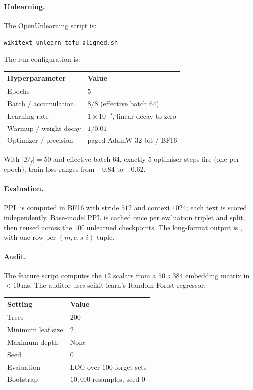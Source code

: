 \documentclass[11pt]{article}
\newcommand{\Df}{\mathcal{D}_f}
\begin{document}
\paragraph{Unlearning.} The OpenUnlearning script is:
\begin{center}
\footnotesize
\texttt{wikitext\_unlearn\_tofu\_aligned.sh}
\end{center}
The run configuration is:
\begin{center}
\footnotesize
\begin{tabular}{@{}ll@{}}
    \toprule
    Hyperparameter & Value \\
    \midrule
    Epochs & $5$ \\
    Batch / accumulation & $8 / 8$ (effective batch $64$) \\
    Learning rate & $1\!\times\!10^{-5}$, linear decay to zero \\
    Warmup / weight decay & $1 / 0.01$ \\
    Optimizer / precision & paged AdamW 32-bit / BF16 \\
    \bottomrule
\end{tabular}
\end{center}
With $|\Df|{=}50$ and effective batch $64$, exactly $5$ optimiser steps fire
(one per epoch); train loss ranges from $-0.84$ to $-0.62$.

\paragraph{Evaluation.} PPL is computed in BF16 with stride $512$ and context
$1024$; each text is scored independently. Base-model PPL is cached once per
evaluation triplet and split, then reused across the $100$ unlearned
checkpoints. The long-format output is , with one row
per $(m,e,s,i)$ tuple.

\paragraph{Audit.} The feature script  computes
the $12$ scalars from a $50\!\times\!384$ embedding matrix in $<\!10$\,ms. The
auditor uses scikit-learn's Random Forest regressor:
\begin{center}
\footnotesize
\begin{tabular}{@{}ll@{}}
    \toprule
    Setting & Value \\
    \midrule
    Trees & $200$ \\
    Minimum leaf size & $2$ \\
    Maximum depth & None \\
    Seed & $0$ \\
    Evaluation & LOO over $100$ forget sets \\
    Bootstrap & $10{,}000$ resamples, seed $0$ \\
    \bottomrule
\end{tabular}
\end{center}
\end{document}

